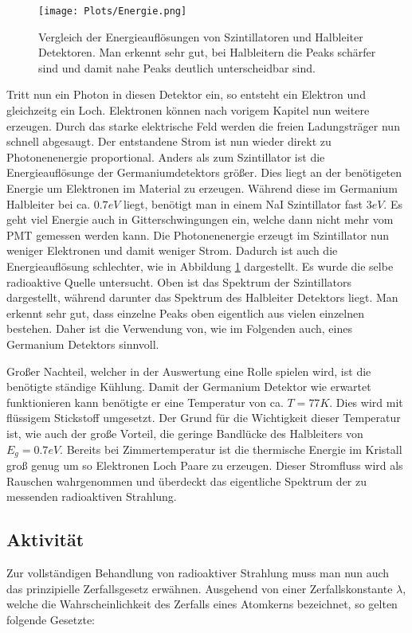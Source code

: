 \documentclass[]{article}
\begin{document}
	\begin{figure}[H]
		\centering
		\texttt{[image: Plots/Energie.png]}
		\caption{Vergleich der Energieauflösungen von Szintillatoren und Halbleiter Detektoren. Man erkennt sehr gut, bei Halbleitern die Peaks schärfer sind und damit nahe Peaks deutlich unterscheidbar sind.}
		\label{fig:energiaufloesung}
	\end{figure}
	
	Tritt nun ein Photon in diesen Detektor ein, so entsteht ein Elektron und gleichzeitg ein Loch. Elektronen können nach vorigem Kapitel nun weitere erzeugen. Durch das starke elektrische Feld werden die freien Ladungsträger nun schnell abgesaugt. Der entstandene Strom ist nun wieder direkt zu Photonenenergie proportional. Anders als zum Szintillator ist die Energieauflösunge der Germaniumdetektors größer. Dies liegt an der benötigeten Energie um Elektronen im Material zu erzeugen. Während diese im Germanium Halbleiter bei ca. $0.7eV$ liegt, benötigt man in einem NaI Szintillator fast $3eV$. \cite{energieaufloesung} Es geht viel Energie auch in Gitterschwingungen ein, welche dann nicht mehr vom PMT gemessen werden kann. Die Photonenenergie erzeugt im Szintillator nun weniger Elektronen und damit weniger Strom. Dadurch ist auch die Energieauflösung schlechter, wie in Abbildung \ref{fig:energiaufloesung} dargestellt. Es wurde die selbe radioaktive Quelle untersucht. Oben ist das Spektrum der Szintillators dargestellt, während darunter das Spektrum des Halbleiter Detektors liegt. Man erkennt sehr gut, dass einzelne Peaks oben eigentlich aus vielen einzelnen bestehen. Daher ist die Verwendung von, wie im Folgenden auch, eines Germanium Detektors sinnvoll.
	
	Großer Nachteil, welcher in der Auswertung eine Rolle spielen wird, ist die benötigte ständige Kühlung. Damit der Germanium Detektor wie erwartet funktionieren kann benötigte er eine Temperatur von ca. $T=77K$. Dies wird mit flüssigem Stickstoff umgesetzt. Der Grund für die Wichtigkeit dieser Temperatur ist, wie auch der große Vorteil, die geringe Bandlücke des Halbleiters von $E_g=0.7eV$. Bereits bei Zimmertemperatur ist die thermische Energie im Kristall groß genug um so Elektronen Loch Paare zu erzeugen. Dieser Stromfluss wird als Rauschen wahrgenommen und überdeckt das eigentliche Spektrum der zu messenden radioaktiven Strahlung.
	
	
	\subsection{Aktivität}
	Zur vollständigen Behandlung von radioaktiver Strahlung muss man nun auch das prinzipielle Zerfallsgesetz erwähnen. Ausgehend von einer Zerfallskonstante $\lambda$, welche die Wahrscheinlichkeit des Zerfalls eines Atomkerns bezeichnet, so gelten folgende Gesetzte:
	
\end{document}
